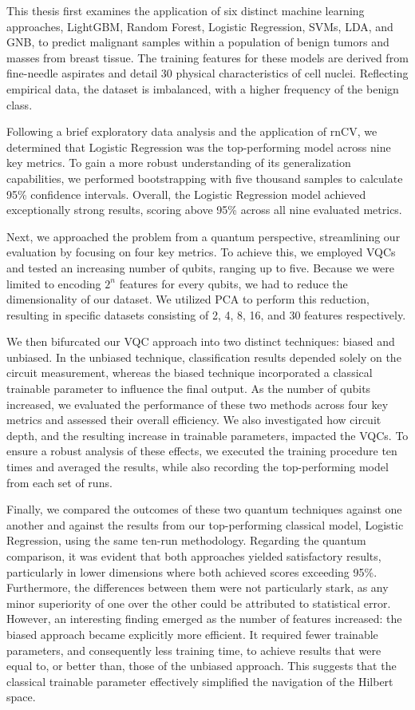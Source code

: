 \documentclass[en]{dimscthesis}
\begin{document}
This thesis first examines the application of six distinct machine learning approaches, LightGBM, Random Forest, Logistic Regression, SVMs, LDA, and GNB, to predict malignant samples within a population of benign tumors and masses from breast tissue. The training features for these models are derived from fine-needle aspirates and detail 30 physical characteristics of cell nuclei. Reflecting empirical data, the dataset is imbalanced, with a higher frequency of the benign class.

Following a brief exploratory data analysis and the application of rnCV, we determined that Logistic Regression was the top-performing model across nine key metrics. To gain a more robust understanding of its generalization capabilities, we performed bootstrapping with five thousand samples to calculate 95\% confidence intervals. Overall, the Logistic Regression model achieved exceptionally strong results, scoring above 95\% across all nine evaluated metrics.

Next, we approached the problem from a quantum perspective, streamlining our evaluation by focusing on four key metrics. To achieve this, we employed VQCs and tested an increasing number of qubits, ranging up to five. Because we were limited to encoding $2^n$ features for every  qubits, we had to reduce the dimensionality of our dataset. We utilized PCA to perform this reduction, resulting in specific datasets consisting of 2, 4, 8, 16, and 30 features respectively.

We then bifurcated our VQC approach into two distinct techniques: biased and unbiased. In the unbiased technique, classification results depended solely on the circuit measurement, whereas the biased technique incorporated a classical trainable parameter to influence the final output. As the number of qubits increased, we evaluated the performance of these two methods across four key metrics and assessed their overall efficiency. We also investigated how circuit depth, and the resulting increase in trainable parameters, impacted the VQCs. To ensure a robust analysis of these effects, we executed the training procedure ten times and averaged the results, while also recording the top-performing model from each set of runs.

Finally, we compared the outcomes of these two quantum techniques against one another and against the results from our top-performing classical model, Logistic Regression, using the same ten-run methodology. Regarding the quantum comparison, it was evident that both approaches yielded satisfactory results, particularly in lower dimensions where both achieved scores exceeding 95\%. Furthermore, the differences between them were not particularly stark, as any minor superiority of one over the other could be attributed to statistical error. However, an interesting finding emerged as the number of features increased: the biased approach became explicitly more efficient. It required fewer trainable parameters, and consequently less training time, to achieve results that were equal to, or better than, those of the unbiased approach. This suggests that the classical trainable parameter effectively simplified the navigation of the Hilbert space.
\end{document}

